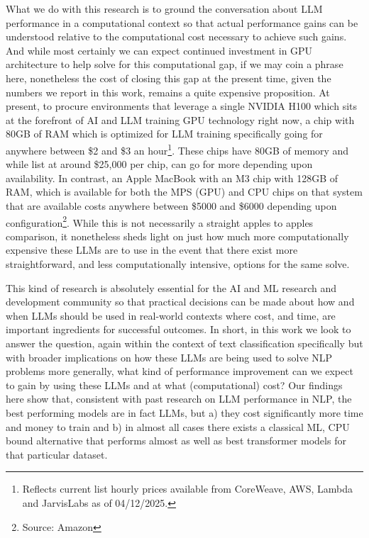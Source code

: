 \documentclass[final]{clv2025}
\begin{document}
What we do with this research is to ground the conversation about LLM performance in a computational context so that actual performance gains can be understood relative to the computational cost necessary to achieve such gains. And while most certainly we can expect continued investment in GPU architecture to help solve for this computational gap, if we may coin a phrase here, nonetheless the cost of closing this gap at the present time, given the numbers we report in this work, remains a quite expensive proposition. At present, to procure environments that leverage a single NVIDIA H100 which sits at the forefront of AI and LLM training GPU technology right now, a chip with 80GB of RAM which is optimized for LLM training specifically going for anywhere between \$2 and \$3 an hour\footnote{  Reflects current list hourly prices available from CoreWeave, AWS, Lambda and JarvisLabs as of 04/12/2025. }.  These chips have 80GB of memory and while list at around \$25,000 per chip, can go for more depending upon availability. In contrast, an Apple MacBook with an M3 chip with 128GB of RAM, which is available for both the MPS (GPU) and CPU chips on that system that are available costs anywhere between \$5000 and \$6000 depending upon configuration\footnote{Source: Amazon}.  While this is not necessarily a straight apples to apples comparison, it nonetheless sheds light on just how much more computationally expensive these LLMs are to use in the event that there exist more straightforward, and less computationally intensive, options for the same solve.

This kind of research is absolutely essential for the AI and ML research and development community so that practical decisions can be made about how and when LLMs should be used in real-world contexts where cost, and time, are important ingredients for successful outcomes. In short, in this work we look to answer the question, again within the context of text classification specifically but with broader implications on how these LLMs are being used to solve NLP problems more generally, what kind of performance improvement can we expect to gain by using these LLMs and at what (computational) cost? Our findings here show that, consistent with past research on LLM performance in NLP, the best performing models are in fact LLMs, but a) they cost significantly more time and money to train and b) in almost all cases there exists a classical ML, CPU bound alternative that performs almost as well as best transformer models for that particular dataset. 
\end{document}
